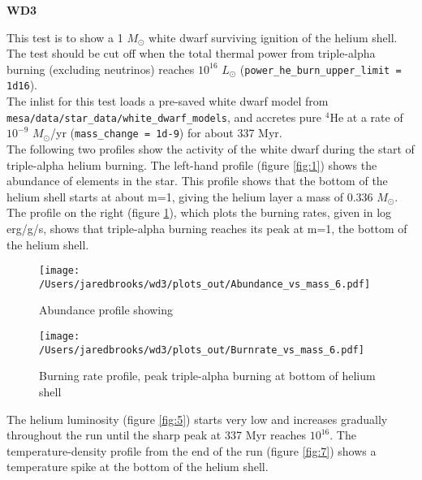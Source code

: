 \documentclass{article}
\begin{document}
	
\begin{center}
  \begin{Large}
    \textbf{WD3}\\
  \end{Large}
\end{center}


        This test is to show a 1 $M_\odot$ white dwarf surviving ignition of the helium shell.  The test should be cut off when the total thermal power from triple-alpha burning (excluding neutrinos) reaches $10^{16}$ $L_\odot$ (\texttt{power\_he\_burn\_upper\_limit = 1d16}).\\

        The inlist for this test loads a pre-saved white dwarf model from \texttt{mesa/data/star\_data/white\_dwarf\_models}, and accretes pure $^4$He at a rate of $10^{-9}$ $M_\odot$/yr (\texttt{mass\_change = 1d-9}) for about 337 Myr.\\

        The following two profiles show the activity of the white dwarf during the start of triple-alpha helium burning.  The left-hand profile (figure \ref{fig:1}) shows the abundance of elements in the star.  This profile shows that the bottom of the helium shell starts at about m=1, giving the helium layer a mass of 0.336 $M_\odot$.  The profile on the right (figure \ref{fig:4}), which plots the burning rates, given in log erg/g/s, shows that triple-alpha burning reaches its peak at m=1, the bottom of the helium shell.

	\begin{figure}[H]
          \begin{minipage}[b]{0.5\linewidth}
	    \centering
	    \texttt{[image: /Users/jaredbrooks/wd3/plots\_out/Abundance\_vs\_mass\_6.pdf]}
	    \caption{Abundance profile showing}
	    \label{fig:1}
          \end{minipage}
          \hspace{0cm}
          \begin{minipage}[b]{0.5\linewidth}
            \centering
            \texttt{[image: /Users/jaredbrooks/wd3/plots\_out/Burnrate\_vs\_mass\_6.pdf]}
            \caption{Burning rate profile, peak triple-alpha burning at bottom of helium shell}
            \label{fig:4}
          \end{minipage}
	\end{figure}

        \pagebreak

        The helium luminosity (figure \ref{fig:5}) starts very low and increases gradually throughout the run until the sharp peak at 337 Myr reaches $10^{16}$.  The temperature-density profile from the end of the run (figure \ref{fig:7}) shows a temperature spike at the bottom of the helium shell.
\end{document}
